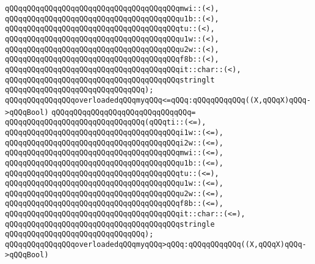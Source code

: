 \verb|qQQqqQQqqQQqqQQqqQQqqQQqqQQqqQQqqQQqqQQqmwi::(<),|\newline
\verb|qQQqqQQqqQQqqQQqqQQqqQQqqQQqqQQqqQQqqQQqu1b::(<),|\newline
\verb|qQQqqQQqqQQqqQQqqQQqqQQqqQQqqQQqqQQqqQQqtu::(<),|\newline
\verb|qQQqqQQqqQQqqQQqqQQqqQQqqQQqqQQqqQQqqQQqu1w::(<),|\newline
\verb|qQQqqQQqqQQqqQQqqQQqqQQqqQQqqQQqqQQqqQQqu2w::(<),|\newline
\verb|qQQqqQQqqQQqqQQqqQQqqQQqqQQqqQQqqQQqqQQqf8b::(<),|\newline
\verb|qQQqqQQqqQQqqQQqqQQqqQQqqQQqqQQqqQQqqQQqit::char::(<),|\newline
\verb|qQQqqQQqqQQqqQQqqQQqqQQqqQQqqQQqqQQqqQQqstringlt|\newline
\verb|qQQqqQQqqQQqqQQqqQQqqQQqqQQqqQQq);|\newline
\newline
\verb|qQQqqQQqqQQqqQQqoverloadedqQQqmyqQQq<=qQQq:qQQqqQQqqQQq((X,qQQqX)qQQq->qQQqBool)|\newline
\verb|qQQqqQQqqQQqqQQqqQQqqQQqqQQqqQQq=|\newline
\verb|qQQqqQQqqQQqqQQqqQQqqQQqqQQqqQQq(qQQqti::(<=),|\newline
\verb|qQQqqQQqqQQqqQQqqQQqqQQqqQQqqQQqqQQqqQQqi1w::(<=),|\newline
\verb|qQQqqQQqqQQqqQQqqQQqqQQqqQQqqQQqqQQqqQQqi2w::(<=),|\newline
\verb|qQQqqQQqqQQqqQQqqQQqqQQqqQQqqQQqqQQqqQQqmwi::(<=),|\newline
\verb|qQQqqQQqqQQqqQQqqQQqqQQqqQQqqQQqqQQqqQQqu1b::(<=),|\newline
\verb|qQQqqQQqqQQqqQQqqQQqqQQqqQQqqQQqqQQqqQQqtu::(<=),|\newline
\verb|qQQqqQQqqQQqqQQqqQQqqQQqqQQqqQQqqQQqqQQqu1w::(<=),|\newline
\verb|qQQqqQQqqQQqqQQqqQQqqQQqqQQqqQQqqQQqqQQqu2w::(<=),|\newline
\verb|qQQqqQQqqQQqqQQqqQQqqQQqqQQqqQQqqQQqqQQqf8b::(<=),|\newline
\verb|qQQqqQQqqQQqqQQqqQQqqQQqqQQqqQQqqQQqqQQqit::char::(<=),|\newline
\verb|qQQqqQQqqQQqqQQqqQQqqQQqqQQqqQQqqQQqqQQqstringle|\newline
\verb|qQQqqQQqqQQqqQQqqQQqqQQqqQQqqQQq);|\newline
\newline
\verb|qQQqqQQqqQQqqQQqoverloadedqQQqmyqQQq>qQQq:qQQqqQQqqQQq((X,qQQqX)qQQq->qQQqBool)|\newline
